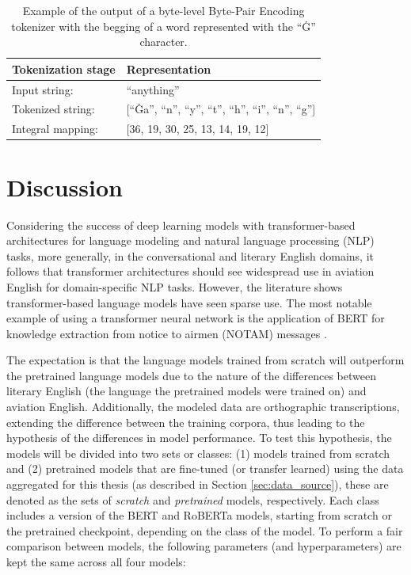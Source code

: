 \documentclass[12pt]{article}
\begin{document}
\begin{table}[!t]
    \centering
    \begin{tabular}{l l}
        \toprule
        Tokenization stage & Representation                                            \\
        \midrule
        Input string:      & ``anything''                                              \\
        Tokenized string:  & [``Ġa'', ``n'', ``y'', ``t'', ``h'', ``i'', ``n'', ``g''] \\
        Integral mapping:  & [36, 19, 30, 25, 13, 14, 19, 12]                          \\
        \bottomrule
    \end{tabular}
    \caption{Example of the output of a byte-level Byte-Pair Encoding tokenizer with the begging of a word represented with the ``Ġ'' character.}
    \label{tab:byte_level_bpe_example}
\end{table}

\section{Discussion}\label{sec:discussion}
Considering the success of deep learning models with transformer-based architectures for language modeling and natural language processing (NLP) tasks, more generally, in the conversational and literary English domains, it follows that transformer architectures should see widespread use in aviation English for domain-specific NLP tasks. However, the literature shows transformer-based language models have seen sparse use. The most notable example of using a transformer neural network is the application of BERT for knowledge extraction from notice to airmen (NOTAM) messages \cite{arnold_knowledge_2022}.

The expectation is that the language models trained from scratch will outperform the pretrained language models due to the nature of the differences between literary English (the language the pretrained models were trained on) and aviation English. Additionally, the modeled data are orthographic transcriptions, extending the difference between the training corpora, thus leading to the hypothesis of the differences in model performance. To test this hypothesis, the models will be divided into two sets or classes: (1) models trained from scratch and (2) pretrained models that are fine-tuned (or transfer learned) using the data aggregated for this thesis (as described in Section \ref{sec:data_source}), these are denoted as the sets of \textit{scratch} and \textit{pretrained} models, respectively. Each class includes a version of the BERT and RoBERTa models, starting from scratch or the pretrained checkpoint, depending on the class of the model. To perform a fair comparison between models, the following parameters (and hyperparameters) are kept the same across all four models:
\end{document}
